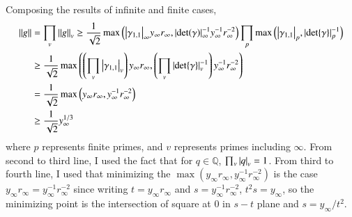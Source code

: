 \documentclass[a4paper, 12pt]{article}
\theoremstyle{Mydefinition}
\theoremstyle{Mytheorem}
\begin{document}
Composing the results of infinite and finite cases,
\begin{equation}
\begin{split}
    \norm{g} &= \prod_v \norm{g}_v\geq \frac{1}{\sqrt{2}}\max\left(\abs{\gamma_{1,1}}_\infty y_\infty r_\infty, \abs{\det(\gamma)}_\infty^{-1}y_\infty^{-1} r_\infty^{-2}\right)\prod_{p}\max\left(\abs{\gamma_{1,1}}_p, \abs{\det{\gamma}}_p^{-1}\right)\\
    &\geq \frac{1}{\sqrt{2}}\max\left(\left(\prod_v\abs{\gamma_{1,1}}_v\right) y_\infty r_\infty, \left(\prod_v \abs{\det{\gamma}}_v^{-1}\right) y_\infty^{-1} r_\infty^{-2}\right)\\
    &=\frac{1}{\sqrt{2}}\max\left(y_\infty r_\infty, y_\infty^{-1} r_\infty^{-2}\right)\\
    &\geq \frac{1}{\sqrt{2}}y_\infty^{1/3}
\end{split}
\end{equation}
where $p$ represents finite primes, and $v$ represents primes including $\infty$. From second to third line, I used the fact that for $q\in \mathbb{Q}$, $\prod_v\abs{q}_v = 1$. From third to fourth line, I used that minimizing the $\max\left(y_\infty r_\infty, y_\infty^{-1} r_\infty^{-2}\right)$ is the case $y_\infty r_\infty = y_\infty^{-1}r_\infty^{-2}$ since writing $t=y_\infty r_\infty$ and $s = y_\infty^{-1}r_\infty^{-2}$, $t^2s = y_\infty$, so the minimizing point is the intersection of square at $0$ in $s-t$ plane and $s=y_\infty/t^2$.
\end{document}
